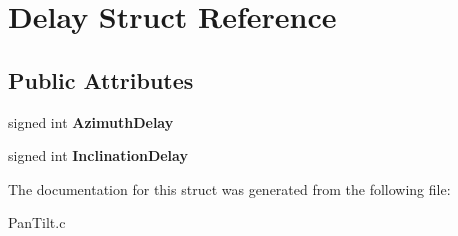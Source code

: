 \hypertarget{struct_delay}{\section{Delay Struct Reference}
\label{struct_delay}
}
\subsection*{Public Attributes}
\begin{DoxyCompactItemize}
\item 
\hypertarget{struct_delay_a4cb4f750cd566d1a1cf61d1fa93d5ce3}{signed int {\bfseries Azimuth\+Delay}}\label{struct_delay_a4cb4f750cd566d1a1cf61d1fa93d5ce3}

\item 
\hypertarget{struct_delay_a19ac2a6a70e80fc14128af5716580d12}{signed int {\bfseries Inclination\+Delay}}\label{struct_delay_a19ac2a6a70e80fc14128af5716580d12}

\end{DoxyCompactItemize}


The documentation for this struct was generated from the following file\+:\begin{DoxyCompactItemize}
\item 
Pan\+Tilt.\+c\end{DoxyCompactItemize}
